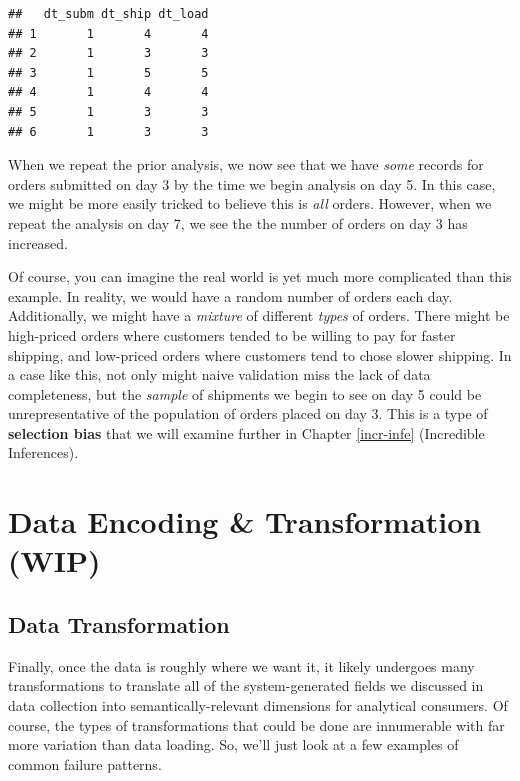 \documentclass[
]{krantz}
\begin{document}
\begin{verbatim}
##   dt_subm dt_ship dt_load
## 1       1       4       4
## 2       1       3       3
## 3       1       5       5
## 4       1       4       4
## 5       1       3       3
## 6       1       3       3
\end{verbatim}

When we repeat the prior analysis, we now see that we have \emph{some} records for orders submitted on day 3 by the time we begin analysis on day 5.
In this case, we might be more easily tricked to believe this is \emph{all} orders.
However, when we repeat the analysis on day 7, we see the the number of orders on day 3 has increased.

Of course, you can imagine the real world is yet much more complicated than this example.
In reality, we would have a random number of orders each day.
Additionally, we might have a \emph{mixture} of different \emph{types} of orders.
There might be high-priced orders where customers tended to be willing to pay for faster shipping,
and low-priced orders where customers tend to chose slower shipping.
In a case like this, not only might naive validation miss the lack of data completeness, but the \emph{sample} of shipments we begin to see on day 5 could be unrepresentative of the population of orders placed on day 3.
This is a type of \textbf{selection bias} that we will examine further in Chapter \ref{incr-infe} (Incredible Inferences).

\hypertarget{data-encoding-transformation-wip}{%
\section{Data Encoding \& Transformation (WIP)}\label{data-encoding-transformation-wip}}

\hypertarget{data-transformation}{%
\subsection{Data Transformation}\label{data-transformation}}

Finally, once the data is roughly where we want it, it likely undergoes many transformations to translate all of the system-generated fields we discussed in data collection into semantically-relevant dimensions for analytical consumers. Of course, the types of transformations that could be done are innumerable with far more variation than data loading. So, we'll just look at a few examples of common failure patterns.
\end{document}
